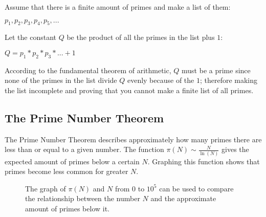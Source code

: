 \documentclass[main.tex]{subfiles}
\begin{document}
\begin{mdframed}
  \begin{center}
    Assume that there is a finite amount of primes and make a list of them:
  \end{center}

  \begin{center}
    $p_1, p_2, p_3, p_4, p_5, ...$
  \end{center}
  \newline

  \begin{center}
    Let the constant $Q$ be the product of all the primes in the list plus $1$:
  \end{center}

  \begin{center}
    $Q = p_1 * p_2 * p_3 * ... + 1$
  \end{center}
  \newline

  \centering
  According to the fundamental theorem of arithmetic, $Q$ must be a prime since
  none of the primes in the list divide $Q$ evenly because of the $1$; therefore
  making the list incomplete and proving that you cannot make a finite list of
  all primes.
\end{mdframed}
\vspace{5mm}

\subsection{The Prime Number Theorem}
The Prime Number Theorem \cite{theorem:prime_num} describes approximately how
many primes there are less than or equal to a given number. The function $\pi(N)
\sim \frac{N}{\ln(N)}$ gives the expected amount of primes below a certain $N$.
Graphing this function shows that primes become less common for greater $N$. \\

\begin{figure}[h]
  \begin{center}
  \end{center}
  \caption{The graph of $\pi(N)$ and $N$ from $0$ to $10^{5}$ can be used to
    compare the relationship between the number $N$ and the approximate amount
    of primes below it.}
\end{figure}
\end{document}

